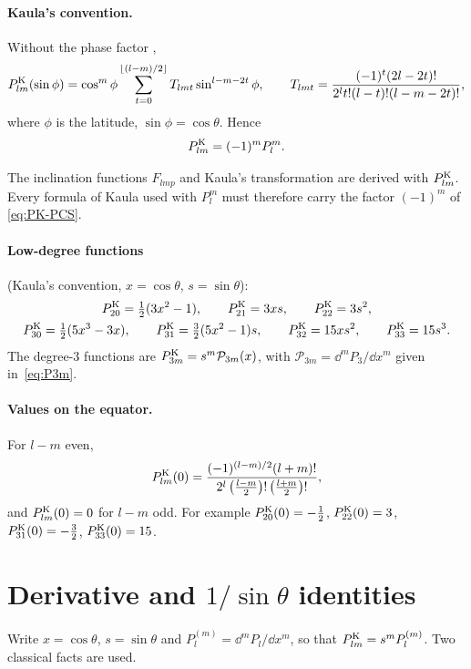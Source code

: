 \paragraph{Kaula's convention.} Without the phase factor \citep[eq.~1.28--1.30]{Kaula2000},
\begin{equation}
  P^{\mathrm K}_{lm}(\sin\phi)=\cos^m\phi\sum_{t=0}^{\lfloor(l-m)/2\rfloor}T_{lmt}\sin^{l-m-2t}\phi,\qquad T_{lmt}=\frac{(-1)^t(2l-2t)!}{2^lt!(l-t)!(l-m-2t)!}, \label{eq:PK}
\end{equation}
where $\phi$ is the latitude, $\sin\phi=\cos\theta$. Hence
\begin{equation}
  P^{\mathrm K}_{lm}=(-1)^mP_l^m. \label{eq:PK-PCS}
\end{equation}

The inclination functions $F_{lmp}$ and Kaula's transformation are derived with $P^{\mathrm K}_{lm}$. Every formula of Kaula used with $P_l^m$ must therefore carry the factor $(-1)^m$ of \eqref{eq:PK-PCS}.

\paragraph{Low-degree functions} (Kaula's convention, $x=\cos\theta$, $s=\sin\theta$):
\begin{gather*}
  P^{\mathrm K}_{20}=\tfrac12(3x^2-1),\qquad P^{\mathrm K}_{21}=3xs,\qquad P^{\mathrm K}_{22}=3s^2,\\
  P^{\mathrm K}_{30}=\tfrac12(5x^3-3x),\qquad P^{\mathrm K}_{31}=\tfrac32(5x^2-1)s,\qquad P^{\mathrm K}_{32}=15xs^2,\qquad P^{\mathrm K}_{33}=15s^3.
\end{gather*}
The degree-3 functions are $P^{\mathrm K}_{3m}=s^m\mathcal P_{3m}(x)$, with $\mathcal P_{3m}=\dd^mP_3/\dd x^m$ given in~\eqref{eq:P3m}.

\paragraph{Values on the equator.} For $l-m$ even,
\[
  P^{\mathrm K}_{lm}(0)=\frac{(-1)^{(l-m)/2}(l+m)!}{2^l\,\big(\tfrac{l-m}{2}\big)!\,\big(\tfrac{l+m}{2}\big)!},
\]
and $P^{\mathrm K}_{lm}(0)=0$ for $l-m$ odd. For example $P^{\mathrm K}_{20}(0)=-\tfrac12$, $P^{\mathrm K}_{22}(0)=3$, $P^{\mathrm K}_{31}(0)=-\tfrac32$, $P^{\mathrm K}_{33}(0)=15$.

\section{Derivative and $1/\sin\theta$ identities}
Write $x=\cos\theta$, $s=\sin\theta$ and $P^{(m)}_l=\dd^mP_l/\dd x^m$, so that $P^{\mathrm K}_{lm}=s^mP^{(m)}_l$. Two classical facts are used.

